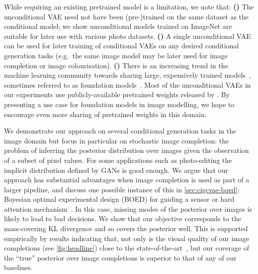 While requiring an existing pretrained model is a limitation, we note that:
\textbf{()} The unconditional VAE need not have been (pre-)trained on the same
dataset as the conditional model; we show unconditional models trained on
ImageNet are suitable for later use with various photo datasets.
\textbf{()} A single unconditional VAE can be used for later training of
conditional VAEs on any desired conditional generation tasks (e.g.~the same
image model may be later used for image completion or image colourisation).
\textbf{()} There is an increasing trend in the machine learning community towards
sharing large, expensively trained models~\citep{wolf2020transformers},
sometimes referred to as foundation models~\citep{bommasani2021opportunities}.
Most of the unconditional VAEs in our experiments use publicly-available
pretrained weights released by \citet{child2020very}. By presenting a use case
for foundation models in image modelling, we hope to encourage even more sharing
of pretrained weights in this domain.

We demonstrate our approach on several conditional generation tasks in the image
domain but focus in particular on stochastic image completion: the problem of
inferring the posterior distribution over images given the observation of a
subset of pixel values.
%
For some applications such as photo-editing the implicit distribution defined by
GANs is good enough. We argue that our approach has substantial advantages when
image completion is used as part of a larger pipeline, and discuss one possible
instance of this in \cref{sec:cigcvae-boed}: Bayesian optimal experimental design (BOED)
for guiding a sensor or hard attention
mechanism~\citep{ma2018eddi,harvey2019near,rangrej2021achieving}. In this case,
missing modes of the posterior over images is likely to lead to bad decisions.
We show that our objective corresponds to the mass-covering KL divergence and so
covers the posterior well.
%
This is supported empirically by results indicating that, not only is the visual
quality of our image completions (see \cref{fig:headline}) close to the
state-of-the-art~\citep{zhao2021large}, but our coverage of the ``true''
posterior over image completions is superior to that of any of our baselines.



